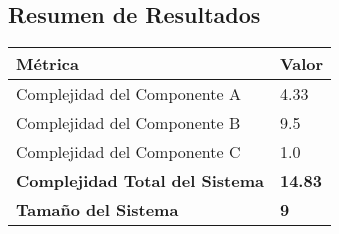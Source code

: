 \subsection{Resumen de Resultados}\label{subsec:resumen-de-resultados}
\begin{table}[h!]
    \center
    \begin{tabular}{|l|l|}
        \hline
        \textbf{Métrica}                       & \textbf{Valor} \\
        \hline
        Complejidad del Componente A           & 4.33           \\
        Complejidad del Componente B           & 9.5            \\
        Complejidad del Componente C           & 1.0            \\
        \hline
        \textbf{Complejidad Total del Sistema} & \textbf{14.83} \\
        \textbf{Tamaño del Sistema}            & \textbf{9}     \\
        \hline
    \end{tabular}\label{tab:table}
\end{table}